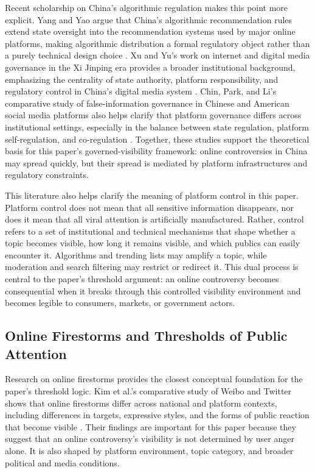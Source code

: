 \documentclass[conference]{IEEEtran}
\begin{document}
Recent scholarship on China's algorithmic regulation makes this point more explicit. Yang and Yao argue that China's algorithmic recommendation rules extend state oversight into the recommendation systems used by major online platforms, making algorithmic distribution a formal regulatory object rather than a purely technical design choice \cite{yang2022algorithmic}. Xu and Yu's work on internet and digital media governance in the Xi Jinping era provides a broader institutional background, emphasizing the centrality of state authority, platform responsibility, and regulatory control in China's digital media system \cite{xu2022regulating}. Chin, Park, and Li's comparative study of false-information governance in Chinese and American social media platforms also helps clarify that platform governance differs across institutional settings, especially in the balance between state regulation, platform self-regulation, and co-regulation \cite{chin2022falseinfo}. Together, these studies support the theoretical basis for this paper's governed-visibility framework: online controversies in China may spread quickly, but their spread is mediated by platform infrastructures and regulatory constraints.

This literature also helps clarify the meaning of platform control in this paper. Platform control does not mean that all sensitive information disappears, nor does it mean that all viral attention is artificially manufactured. Rather, control refers to a set of institutional and technical mechanisms that shape whether a topic becomes visible, how long it remains visible, and which publics can easily encounter it. Algorithms and trending lists may amplify a topic, while moderation and search filtering may restrict or redirect it. This dual process is central to the paper's threshold argument: an online controversy becomes consequential when it breaks through this controlled visibility environment and becomes legible to consumers, markets, or government actors.

\subsection{Online Firestorms and Thresholds of Public Attention}

Research on online firestorms provides the closest conceptual foundation for the paper's threshold logic. Kim et al.'s comparative study of Weibo and Twitter shows that online firestorms differ across national and platform contexts, including differences in targets, expressive styles, and the forms of public reaction that become visible \cite{kim2021firestorms}. Their findings are important for this paper because they suggest that an online controversy's visibility is not determined by user anger alone. It is also shaped by platform environment, topic category, and broader political and media conditions.
\end{document}
